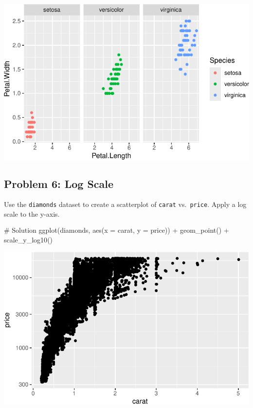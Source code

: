 \documentclass[
  letterpaper,
  DIV=11,
  numbers=noendperiod]{scrreprt}
\newenvironment{Shaded}{\begin{snugshade}}{\end{snugshade}}
\newcommand{\AttributeTok}[1]{\textcolor[rgb]{0.40,0.45,0.13}{#1}}
\newcommand{\CommentTok}[1]{\textcolor[rgb]{0.37,0.37,0.37}{#1}}
\newcommand{\FunctionTok}[1]{\textcolor[rgb]{0.28,0.35,0.67}{#1}}
\newcommand{\NormalTok}[1]{\textcolor[rgb]{0.00,0.23,0.31}{#1}}
\newcommand{\SpecialCharTok}[1]{\textcolor[rgb]{0.37,0.37,0.37}{#1}}
\begin{document}
\includegraphics{Advanced_Scatterplot_Techniques_files/figure-pdf/unnamed-chunk-24-1.pdf}

\subsection*{Problem 6: Log Scale}\label{problem-6-log-scale}

Use the \texttt{diamonds} dataset to create a scatterplot of
\texttt{carat} vs.~\texttt{price}. Apply a log scale to the y-axis.

\begin{Shaded}
\begin{Highlighting}[]
\CommentTok{\# Solution}
\FunctionTok{ggplot}\NormalTok{(diamonds, }\FunctionTok{aes}\NormalTok{(}\AttributeTok{x =}\NormalTok{ carat, }\AttributeTok{y =}\NormalTok{ price)) }\SpecialCharTok{+}
  \FunctionTok{geom\_point}\NormalTok{() }\SpecialCharTok{+}
  \FunctionTok{scale\_y\_log10}\NormalTok{()}
\end{Highlighting}
\end{Shaded}

\includegraphics{Advanced_Scatterplot_Techniques_files/figure-pdf/unnamed-chunk-25-1.pdf}
\end{document}

